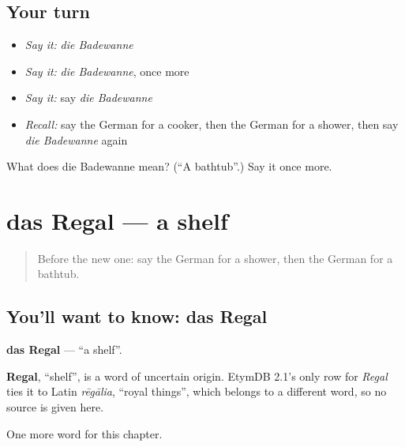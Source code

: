 \subsection*{Your turn}
\begin{itemize}
\raggedright
  \item \emph{Say it:} \emph{die Badewanne}
  \item \emph{Say it:} \emph{die Badewanne}, once more
  \item \emph{Say it:} say \emph{die Badewanne}
  \item \emph{Recall:} say the German for a cooker, then the German for a shower, then say \emph{die Badewanne} again
\end{itemize}

\begin{tcolorbox}[breakable,colback=teal!4,colframe=teal!35!black,title={Before you move on}]
What does die Badewanne mean? (\textquotedblleft{}A bathtub\textquotedblright{}.) Say it once more.
\end{tcolorbox}
\section[das Regal]{das Regal — a shelf}

\label{lesson:GE-C113-regal}



\begin{quote}
Before the new one: say the German for a shower, then the German for a bathtub.
\end{quote}

\subsection*{You'll want to know: das Regal}
\textbf{das Regal} — \textquotedblleft{}a shelf\textquotedblright{}.

\begin{cousinweb}
\textbf{Regal}, \textquotedblleft{}shelf\textquotedblright{}, is a word of uncertain origin. EtymDB 2.1's only row for \emph{Regal} ties it to Latin \emph{rēgālia}, \textquotedblleft{}royal things\textquotedblright{}, which belongs to a different word, so no source is given here.
\end{cousinweb}

\begin{grammarlens}[title={What you've built}]
One more word for this chapter.
\end{grammarlens}

